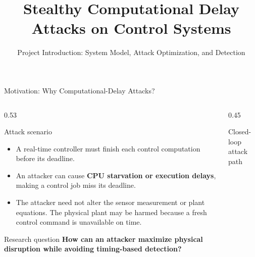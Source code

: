 \documentclass[9pt,aspectratio=169]{beamer}
\title{Stealthy Computational Delay Attacks on Control Systems}
\subtitle{Project Introduction: System Model, Attack Optimization, and Detection}
\author{}
\date{}
\newcommand{\tightitemize}{
    \setlength{\itemsep}{1.5pt}
    \setlength{\parskip}{0pt}
    \setlength{\topsep}{2pt}
}
\begin{document}
\begin{frame}{Motivation: Why Computational-Delay Attacks?}

\begin{columns}[T,onlytextwidth]

\begin{column}{0.53\textwidth}

\begin{block}{Attack scenario}
\begin{itemize}
\tightitemize
    \item A real-time controller must finish each control
    computation before its deadline.

    \item An attacker can cause \textbf{CPU starvation or
    execution delays}, making a control job miss its deadline.

    \item The attacker need not alter the sensor measurement
    or plant equations. The physical plant may be harmed
    because a fresh control command is unavailable on time.
\end{itemize}
\end{block}

\begin{alertblock}{Research question}
\centering
\textbf{How can an attacker maximize physical disruption
while avoiding timing-based detection?}
\end{alertblock}

\end{column}

\begin{column}{0.45\textwidth}

\begin{block}{Closed-loop attack path}
\centering

\end{block}
\end{column}
\end{columns}
\end{frame}
\end{document}
